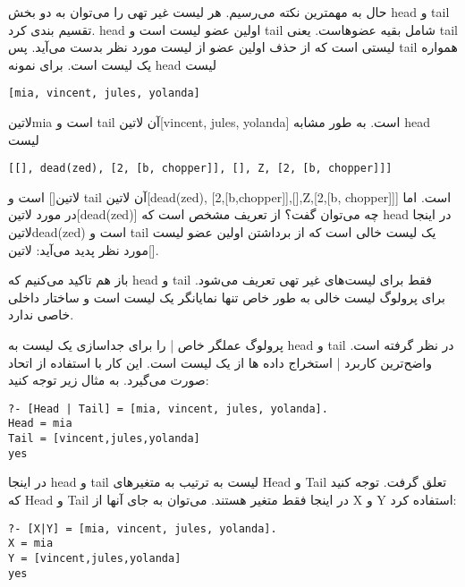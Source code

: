 حال به مهمترین نکته می‌رسیم. هر لیست غیر تهی را می‌توان به دو بخش head و tail‌ تقسیم بندی کرد. head اولین عضو لیست است و tail شامل بقیه عضوهاست. یعنی tail لیستی است که از حذف اولین عضو از لیست مورد نظر بدست می‌آید. پس tail همواره یک لیست است. برای نمونه head لیست

\begin{latin}
\begin{lstlisting}
[mia, vincent, jules, yolanda]
\end{lstlisting}
\end{latin}

‌لاتین{mia} است و tail آن ‌لاتین{[vincent, jules, yolanda]} است. به طور مشابه head لیست

\begin{latin}
\begin{lstlisting}
[[], dead(zed), [2, [b, chopper]], [], Z, [2, [b, chopper]]]
\end{lstlisting}
\end{latin}

‌لاتین{[]} است و tail آن ‌لاتین{[dead(zed), [2,[b,chopper]],[],Z,[2,[b, chopper]]]} است. اما در مورد ‌لاتین{[dead(zed)]} چه می‌توان گفت؟ از تعریف مشخص است که head در اینجا ‌لاتین{dead(zed)} است و tail یک لیست خالی است که از برداشتن اولین عضو لیست مورد نظر پدید می‌آید: ‌لاتین{[]}.

باز هم تاکید می‌کنیم که head و tail فقط برای لیست‌های غیر تهی تعریف می‌شود. برای پرولوگ لیست خالی به طور خاص تنها نمایانگر یک لیست است و ساختار داخلی خاصی ندارد.

پرولوگ عملگر خاص | را برای جداسازی یک لیست به head و tail در نظر گرفته است. واضح‌ترین کاربرد | استخراج داده ها از یک لیست است. این کار با استفاده از اتحاد صورت می‌گیرد. به مثال زیر توجه کنید:

\begin{latin}
\begin{lstlisting}
?- [Head | Tail] = [mia, vincent, jules, yolanda].
Head = mia
Tail = [vincent,jules,yolanda]
yes
\end{lstlisting}
\end{latin}

در اینجا head و tail لیست به ترتیب به متغیرهای Head و Tail تعلق گرفت. توجه کنید که Head و Tail‌ در اینجا فقط متغیر هستند. می‌توان به جای آنها از X و Y استفاده کرد:

\begin{latin}
\begin{lstlisting}
?- [X|Y] = [mia, vincent, jules, yolanda].
X = mia
Y = [vincent,jules,yolanda]
yes
\end{lstlisting}
\end{latin}

